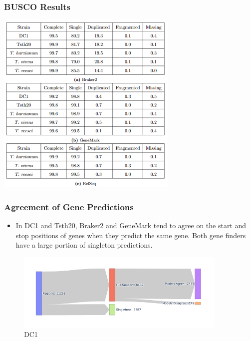 \documentclass[t]{beamer}
\begin{document}
\begin{frame}
	\frametitle{BUSCO Results}
	\centering
	\includegraphics[width=0.65\textwidth]{../../working-thesis/figures/busco-screenshot.png}
\end{frame}

\begin{frame}
	\frametitle{Agreement of Gene Predictions}
	\centering
	\begin{itemize}
		\item In DC1 and Tsth20, Braker2 and GeneMark tend to agree on the start and stop positions of genes when they predict the same gene. Both gene finders have a large portion of singleton predictions.
	\end{itemize}
	\begin{figure}
		\includegraphics[width=0.9\textwidth]{../../working-thesis/figures/dc1-region-breakdown.png}
		\caption{DC1}
	\end{figure}
\end{frame}
\end{document}

